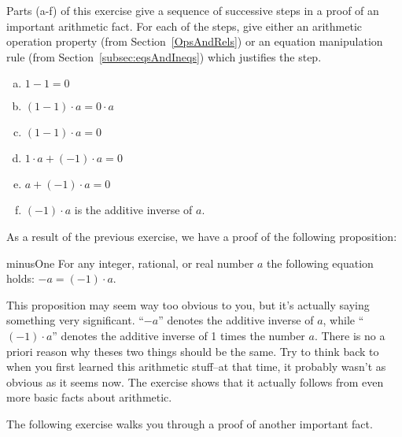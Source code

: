 \begin{exercise}{}
Parts (a-f) of this exercise give a sequence of successive steps in a proof of an important arithmetic fact. For each of the steps, give either an arithmetic operation property (from Section~\ref{OpsAndRels}) or an equation manipulation rule (from Section~\ref{subsec:eqsAndIneqs}) which justifies the step.
\begin{enumerate}[(a)]
\item
$1 -1 = 0$
\item
$(1-1)\cdot a = 0 \cdot a$
\item
$(1-1)\cdot a = 0$
\item
$1 \cdot a + (-1) \cdot a = 0$
\item
$a + (-1) \cdot a = 0$
\item
$(-1) \cdot a$ is the additive inverse of $a$.
\end{enumerate}
\end{exercise}

As a result of the previous exercise, we have a proof of the following proposition:

\begin{prop}{minusOne}
For any integer, rational, or real number $a$ the following equation holds: $ -a =  (-1) \cdot a $. 
\end{prop}
This proposition may seem way too obvious to you, but it's actually saying something very significant. ``$-a$'' denotes the additive inverse of $a$, while ``$(-1) \cdot a$'' denotes the additive inverse of 1 times the number $a$. There is no a priori reason why theses two things should be the same. Try to think back to when you first learned this arithmetic stuff--at that time, it probably wasn't as obvious as it seems now. The exercise shows that it actually follows from even more basic facts about arithmetic.


The following exercise walks you through a proof of another important fact.

